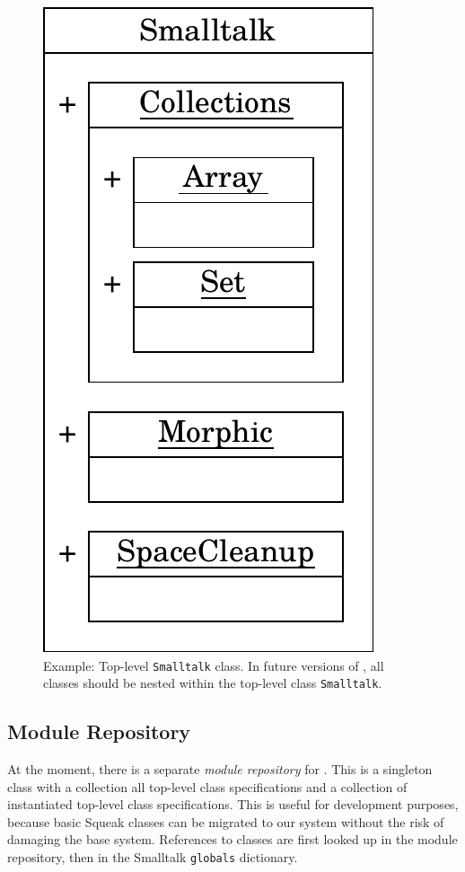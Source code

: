 \begin{figure}
	\includegraphics[scale=0.75]{st_nested.pdf}
	\centering
	\caption[Example: Top-level \texttt{Smalltalk} class]{Example: Top-level \texttt{Smalltalk} class. In future versions of \msname, all classes should be nested within the top-level class \texttt{Smalltalk}.}
	\label{fig:impl_st_nested_future}
\end{figure}
\subsection{Module Repository}
\label{sec:impl_module_rep}
At the moment, there is a separate \emph{module repository} for \msname. This is a singleton class with a collection all top-level class specifications and a collection of instantiated top-level class specifications. This is useful for development purposes, because basic Squeak classes can be migrated to our system without the risk of damaging the base system. References to classes are first looked up in the module repository, then in the Smalltalk \texttt{globals} dictionary.

